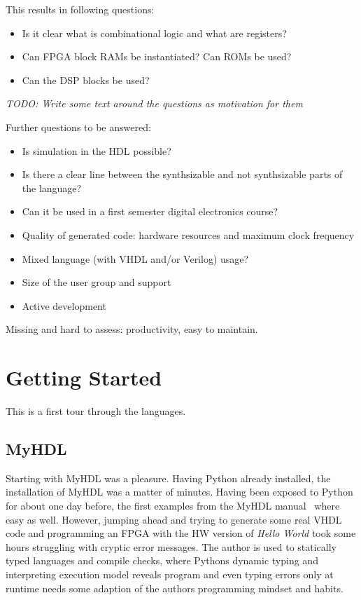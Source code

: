 \documentclass[10pt, conference, compsocconf]{IEEEtran}
\newcommand{\todo}[1]{{\emph{TODO: #1}}}
\begin{document}
This results in following questions:
\begin{itemize}
\item Is it clear what is combinational logic and what are registers?
\item Can FPGA block RAMs be instantiated? Can ROMs be used?
\item Can the DSP blocks be used?
\end{itemize}

\todo{Write some text around the questions as motivation for them}

Further questions to be answered:

\begin{itemize}
\item Is simulation in the HDL possible?
\item Is there a clear line between the synthsizable  and not synthsizable parts of the language?
\item Can it be used in a first semester digital electronics course?
\item Quality of generated code: hardware resources and maximum clock frequency
\item Mixed language (with VHDL and/or Verilog) usage?
\item Size of the user group and support
\item Active development
\end{itemize}

Missing and hard to assess: productivity, easy to maintain.

\section{Getting Started}

This is a first tour through the languages.

\subsection{MyHDL}

Starting with MyHDL was a pleasure. Having Python already installed, the installation
of MyHDL was a matter of minutes. Having been exposed to Python for about one
day before, the first examples from the MyHDL manual~\cite{myhdl:2010} where easy as well.
However, jumping ahead and trying to generate some real VHDL code and programming
an FPGA with the HW version of \emph{Hello World} took some hours struggling
with cryptic error messages. The author is used to statically typed languages and
compile checks, where Pythons dynamic typing and interpreting execution model
reveals program and even typing errors only at runtime needs some adaption of
the authors programming mindset and habits.
\end{document}
